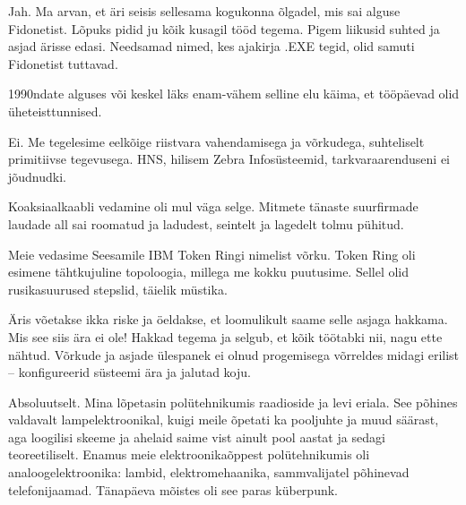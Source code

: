 
Jah. Ma arvan, et äri seisis sellesama kogukonna õlgadel, mis sai alguse Fidonetist. Lõpuks pidid ju kõik kusagil tööd tegema. Pigem liikusid
suhted ja asjad ärisse edasi. Needsamad nimed, kes ajakirja .EXE tegid, olid samuti Fidonetist tuttavad. 


1990ndate alguses või keskel läks enam-vähem selline elu käima, et tööpäevad olid üheteisttunnised. 


Ei. Me tegelesime eelkõige riistvara vahendamisega ja võrkudega, 
suhteliselt primitiivse tegevusega. HNS, hilisem Zebra 
Infosüsteemid, tarkvaraarenduseni ei jõudnudki.


Koaksiaalkaabli vedamine oli mul väga selge. Mitmete tänaste suurfirmade 
laudade all sai roomatud ja ladudest, seintelt ja lagedelt tolmu pühitud.


Meie vedasime Seesamile IBM Token Ringi 
nimelist võrku. Token Ring oli esimene tähtkujuline topoloogia, millega me kokku puutusime. Sellel 
olid rusikasuurused stepslid, täielik müstika.
 

Äris võetakse ikka riske ja öeldakse, et loomulikult saame selle asjaga hakkama. Mis see siis ära 
ei ole! Hakkad tegema ja selgub, et kõik töötabki nii, nagu ette nähtud.
Võrkude ja asjade ülespanek ei olnud progemisega võrreldes midagi
erilist – konfigureerid süsteemi ära ja jalutad koju.


Absoluutselt. Mina lõpetasin polütehnikumis 
raadioside ja levi eriala. See põhines valdavalt lampelektroonikal, kuigi 
meile õpetati ka pooljuhte ja muud säärast, aga loogilisi skeeme ja
ahelaid saime vist ainult pool aastat ja sedagi 
teoreetiliselt. Enamus meie elektroonikaõppest polütehnikumis oli 
analoogelektroonika: lambid, elektromehaanika, sammvalijatel 
põhinevad telefonijaamad. Tänapäeva mõistes oli see paras küberpunk. 


